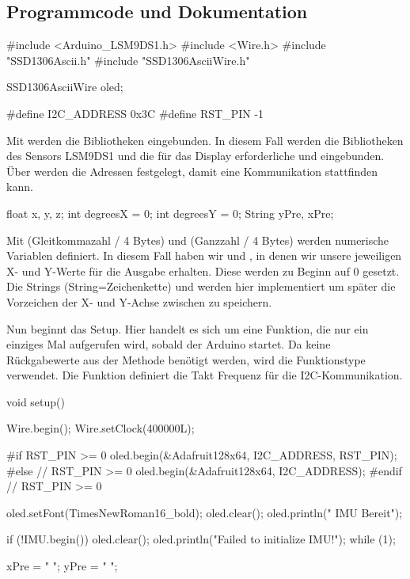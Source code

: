 \subsection{Programmcode und Dokumentation}

\begin{Arduino}
#include <Arduino_LSM9DS1.h>
#include <Wire.h>
#include "SSD1306Ascii.h"
#include "SSD1306AsciiWire.h"
    
SSD1306AsciiWire oled;
    
#define I2C_ADDRESS 0x3C
#define RST_PIN -1
\end{Arduino}



 Mit  werden die Bibliotheken eingebunden. In diesem Fall werden die Bibliotheken des  Sensors LSM9DS1 und die für das Display erforderliche  und  eingebunden. Über  werden die Adressen festgelegt, damit eine Kommunikation stattfinden kann. 



\begin{Arduino}
float x, y, z;
int degreesX = 0;
int degreesY = 0;
String yPre, xPre;
\end{Arduino}

Mit  (Gleitkommazahl / 4 Bytes) und  (Ganzzahl / 4 Bytes) werden numerische Variablen definiert. In diesem Fall haben wir  und , in denen wir unsere jeweiligen X- und Y-Werte für die Ausgabe erhalten. Diese werden zu Beginn auf 0 gesetzt. Die Strings (String=Zeichenkette)  und  werden hier implementiert um später die Vorzeichen der X- und Y-Achse zwischen zu speichern.


Nun beginnt das Setup. Hier handelt es sich um eine Funktion, die nur ein einziges Mal aufgerufen wird, sobald der Arduino startet. Da keine Rückgabewerte aus der Methode benötigt werden, wird die Funktionstype  verwendet. Die Funktion  definiert die Takt Frequenz für die I2C-Kommunikation. 

\begin{Arduino}
void setup() 
{
  Wire.begin();
  Wire.setClock(400000L);
        
  #if RST_PIN >= 0
  oled.begin(&Adafruit128x64, I2C_ADDRESS, RST_PIN);
  #else   // RST_PIN >= 0
  oled.begin(&Adafruit128x64, I2C_ADDRESS);
  #endif  // RST_PIN >= 0      

  oled.setFont(TimesNewRoman16_bold);
  oled.clear();
  oled.println(" IMU Bereit");
        
  if (!IMU.begin()) 
  {
    oled.clear();
    oled.println("Failed to initialize IMU!");
    while (1);
  }
        
        
  xPre = "   ";
  yPre = "   ";
}
\end{Arduino}

